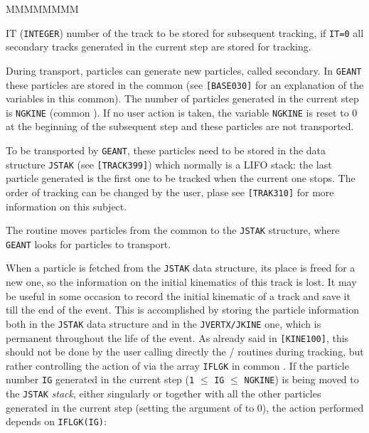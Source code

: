        
       

\begin{DLtt}{MMMMMMMM}
\item[IT] ({\tt INTEGER}) number of the track to be stored for subsequent
tracking, if {\tt IT=0} all secondary tracks generated in the current
step are stored for tracking.
\end{DLtt}

During transport, particles can generate new particles, called 
secondary. In {\tt GEANT} these particles are stored in the common
 (see {\tt [BASE030]} for an explanation of the
variables in this common). The number of particles generated in
the current step is {\tt NGKINE} (common ). If no
user action is taken, the variable {\tt NGKINE} is reset to 0 at the
beginning of the subsequent step and these particles are not transported.

To be transported by {\tt GEANT}, these particles need to be stored
in the data structure {\tt JSTAK} (see {\tt [TRACK399]}) which
normally is a
LIFO stack: the last particle generated is the first one to be
tracked when the current one stops. The order of tracking can be changed 
by the user, plase see {\tt [TRAK310]} for more information on this
subject. 

The routine  moves particles from the  common
to the {\tt JSTAK} structure, where {\tt GEANT} looks for particles to 
transport.

When a particle is fetched from the {\tt JSTAK} data structure, its place
is freed for a new one, so the information on the initial kinematics of
this track is lost. It may be useful in some occasion to record the initial
kinematic of a track and save it till the end of the event. This is accomplished
by storing the particle information both in the {\tt JSTAK} data structure
and in the {\tt JVERTX/JKINE} one, which is permanent throughout the life
of the event. As already said in {\tt [KINE100]}, this should not be done
by the user calling directly the / routines
during tracking, but rather controlling the action of  via
the array {\tt IFLGK} in common . If the particle number
{\tt IG} generated in the current step ({\tt 1} $\leq$ {\tt IG} $\leq$ 
{\tt NGKINE}) is being moved to the {\tt JSTAK} {\it stack}, either
singularly or together with all the other particles generated in the
current step (setting the argument of  to 0), the action
performed depends on {\tt IFLGK(IG)}:

